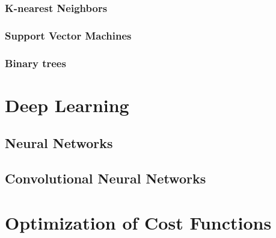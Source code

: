 \subsubsection{K-nearest Neighbors}
\subsubsection{Support Vector Machines}
\subsubsection{Binary trees}

\section{Deep Learning}
\subsection{Neural Networks}
\subsection{Convolutional Neural Networks}
\section{Optimization of Cost Functions}

